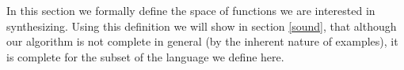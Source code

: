 In this section we formally define the space of functions we are interested in synthesizing. Using this definition we will show in section \ref{sound}, that although our algorithm is not complete in general (by the inherent nature of examples), it is complete for the subset of the language we define here.


